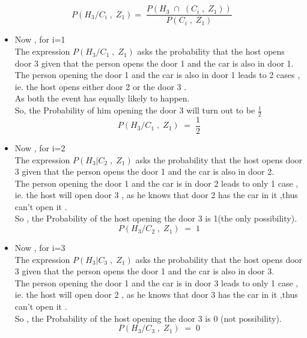 \documentclass[11pt,a4paper,titlepage]{article}
\begin{document}
{{\subsection{}{
$$P(H_3/C_i\;,\; Z_1)=\; \frac{P(H_3\;\cap\;(C_i\;,\; Z_1))}{P(C_i\;,\; Z_1)}$$
\begin{itemize}
    \item Now , for i=1\\
    The expression $P(H_3/C_1\;,\; Z_1)$ asks the probability that the host opens door 3 given that the person opens the door 1 and the car is also in door 1.\\
    The person opening the door 1 and the car is also in door 1 leads to 2 cases , ie. the host opens either door 2 or the door 3 .\\
    As both the event has equally likely to happen.\\
    So, the Probability of him opening the door 3 will turn out to be $\frac{1}{2}$ 
    $$P(H_3/C_1\;,\; Z_1)\;=\;\frac{1}{2}$$
    \item Now , for i=2\\
    The expression $P(H_3|C_2\;,\; Z_1)$ asks the probability that the host opens door 3 given that the person opens the door 1 and the car is also in door 2.\\ 
    The person opening the door 1 and the car is in door 2 leads to only 1 case , ie. the host will open door 3 , as he knows that door 2 has the car in it ,thus can't open it .\\
    So , the Probability of the host opening the door 3 is 1(the only possibility).
    $$P(H_3/C_2\;,\; Z_1)\;=\;1$$
    \item Now , for i=3\\
    The expression $P(H_3|C_3\;,\; Z_1)$ asks the probability that the host opens door 3 given that the person opens the door 1 and the car is also in door 3.\\ 
    The person opening the door 1 and the car is in door 3 leads to only 1 case , ie. the host will open door 2 , as he knows that door 3 has the car in it ,thus can't open it .\\
    So , the Probability of the host opening the door 3 is 0 (not possibility).
    $$P(H_3/C_3\;,\; Z_1)\;=\;0$$
\end{itemize}
}
\newpage
}}
\end{document}
